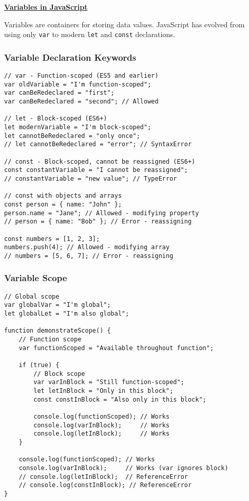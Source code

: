 \documentclass[12pt,a4paper,oneside]{book}
\newcommand{\mysection}[1]{%
    \vspace{0.3em}
    {\large\bfseries\underline{#1}}
    \vspace{0.2em}
    \addcontentsline{toc}{section}{#1}
}
\begin{document}
\mysection{Variables in JavaScript}

Variables are containers for storing data values. JavaScript has evolved from using only \texttt{var} to modern \texttt{let} and \texttt{const} declarations.

\subsubsection{Variable Declaration Keywords}

\begin{lstlisting}[style=javascript, caption={\textbf{Variable Declaration Methods - var, let, const}}, label=lst:variables]
// var - Function-scoped (ES5 and earlier)
var oldVariable = "I'm function-scoped";
var canBeRedeclared = "first";
var canBeRedeclared = "second"; // Allowed

// let - Block-scoped (ES6+)
let modernVariable = "I'm block-scoped";
let cannotBeRedeclared = "only once";
// let cannotBeRedeclared = "error"; // SyntaxError

// const - Block-scoped, cannot be reassigned (ES6+)
const constantVariable = "I cannot be reassigned";
// constantVariable = "new value"; // TypeError

// const with objects and arrays
const person = { name: "John" };
person.name = "Jane"; // Allowed - modifying property
// person = { name: "Bob" }; // Error - reassigning

const numbers = [1, 2, 3];
numbers.push(4); // Allowed - modifying array
// numbers = [5, 6, 7]; // Error - reassigning
\end{lstlisting}

\subsubsection{Variable Scope}

\begin{lstlisting}[style=javascript, caption={\textbf{Understanding Variable Scope}}, label=lst:scope]
// Global scope
var globalVar = "I'm global";
let globalLet = "I'm also global";

function demonstrateScope() {
    // Function scope
    var functionScoped = "Available throughout function";
    
    if (true) {
        // Block scope
        var varInBlock = "Still function-scoped";
        let letInBlock = "Only in this block";
        const constInBlock = "Also only in this block";
        
        console.log(functionScoped); // Works
        console.log(varInBlock);     // Works
        console.log(letInBlock);     // Works
    }
    
    console.log(functionScoped); // Works
    console.log(varInBlock);     // Works (var ignores block)
    // console.log(letInBlock);  // ReferenceError
    // console.log(constInBlock); // ReferenceError
}
\end{lstlisting}
\end{document}
